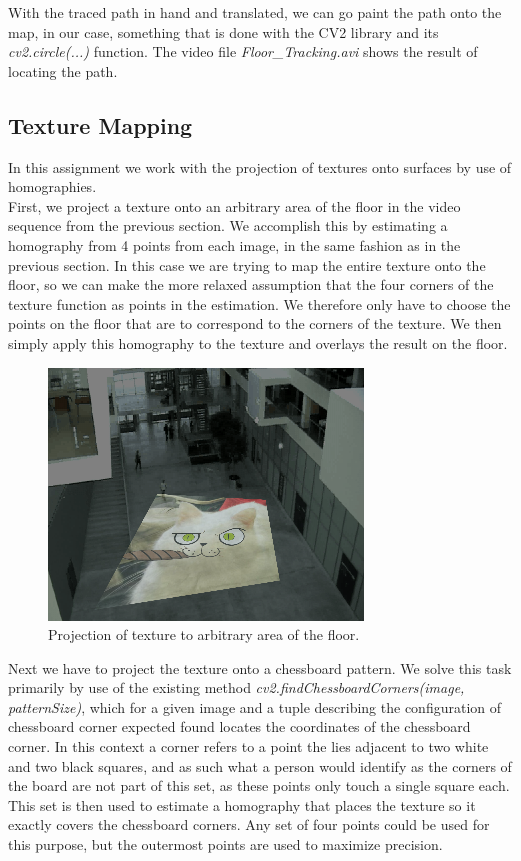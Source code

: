 With the traced path in hand and translated, we can go paint the path onto the map, in our case, something that is done with the CV2 library and its \textsl{cv2.circle(...)} function.
The video file \textsl{Floor\_Tracking.avi} shows the result of locating the path.

\subsection{Texture Mapping}
In this assignment we work with the projection of textures onto surfaces by use of homographies.\\
First, we project a texture onto an arbitrary area of the floor in the video sequence from the previous section. We accomplish this by estimating a homography from 4 points from each image, in the same fashion as in the previous section. In this case we are trying to map the entire texture onto the floor, so we can make the more relaxed assumption that the four corners of the texture function as points in the estimation. We therefore only have to choose the points on the floor that are to correspond to the corners of the texture. We then simply apply this homography to the texture and overlays the result on the floor. 
\begin{figure}[h]
	\centering
	\includegraphics[scale=1]{images/texture_simple.png}
	\caption{Projection of texture to arbitrary area of the floor.}
\end{figure}
Next we have to project the texture onto a chessboard pattern. We solve this task primarily by use of the existing method \textsl{cv2.findChessboardCorners(image, patternSize)}, which for a given image and a tuple describing the configuration of chessboard corner expected found locates the coordinates of the chessboard corner. In this context a corner refers to a point the lies adjacent to two white and two black squares, and as such what a person would identify as the corners of the board are not part of this set, as these points only touch a single square each. This set is then used to estimate a homography that places the texture so it exactly covers the chessboard corners. Any set of four points could be used for this purpose, but the outermost points are used to maximize precision. \\
